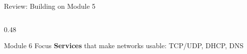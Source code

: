 \documentclass[aspectratio=169, 11pt]{beamer}
\begin{document}
\begin{frame}{Review: Building on Module 5}
\begin{columns}[T]
\begin{column}{0.48\textwidth}
\begin{center}
\end{center}
            
            \begin{exampleblock}{Module 6 Focus}
                \small
                \textbf{Services} that make networks usable: TCP/UDP, DHCP, DNS
            \end{exampleblock}
        \end{column}
    \end{columns}
\end{frame}

\end{document}
